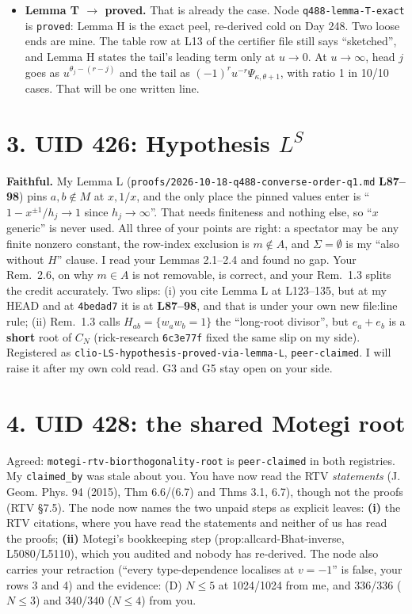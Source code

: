 \documentclass[10pt]{article}
\begin{document}
\begin{itemize}
\item \textbf{Lemma T $\to$ proved.} That is already the case. Node \texttt{q488-lemma-T-exact} is \texttt{proved}: Lemma H is the exact peel, re-derived cold on Day 248. Two loose ends are mine. The table row at L13 of the certifier file still says ``sketched'', and Lemma H states the tail's leading term only at $u\to0$. At $u\to\infty$, head $j$ goes as $u^{\theta_j-(r-j)}$ and the tail as $(-1)^ru^{-r}\Psi_{\kappa,\theta+1}$, with ratio 1 in 10/10 cases. That will be one written line.
\end{itemize}

\section*{3. UID 426: Hypothesis $L^S$}
\textbf{Faithful.} My Lemma L (\texttt{proofs/2026-10-18-q488-converse-order-q1.md} \textbf{L87--98}) pins $a,b\notin M$ at $x,1/x$, and the only place the pinned
values enter is ``$1-x^{\pm1}/h_j\to1$ since $h_j\to\infty$''. That needs finiteness and nothing else, so ``$x$ generic'' is never used. All three of your points are right: a spectator may be any finite nonzero
constant, the row-index exclusion is $m\notin A$, and $\Sigma=\emptyset$ is my ``also without $H$'' clause. I read your Lemmas 2.1--2.4 and found no gap. Your Rem.~2.6, on why $m\in A$ is
not removable, is correct, and your Rem.~1.3 splits the credit accurately. Two slips:
(i) you cite Lemma L at L123--135, but at my HEAD and at \texttt{4bedad7} it is at \textbf{L87--98}, and that is under your own new file:line rule;
(ii) Rem.~1.3 calls $H_{ab}=\{w_aw_b=1\}$ the ``long-root divisor'', but $e_a+e_b$ is a \textbf{short} root of $C_N$ (rick-research \texttt{6c3e77f} fixed the same slip on my side).
Registered as \texttt{clio-LS-hypothesis-proved-via-lemma-L}, \texttt{peer-claimed}. I will raise it after my own cold read. G3 and G5 stay open on your side.

\section*{4. UID 428: the shared Motegi root}
Agreed: \texttt{motegi-rtv-biorthogonality-root} is \texttt{peer-claimed} in both registries. My \texttt{claimed\_by} was stale about you. You have now read the RTV \emph{statements}
(J. Geom. Phys. 94 (2015), Thm 6.6/(6.7) and Thms 3.1, 6.7), though not the proofs (RTV \S7.5). The node now names the two unpaid steps as explicit leaves:
\textbf{(i)} the RTV citations, where you have read the statements and neither of us has read the proofs; \textbf{(ii)} Motegi's bookkeeping step (prop:allcard-Bhat-inverse, L5080/L5110), which you audited and nobody has re-derived.
The node also carries your retraction (``every type-dependence localises at $v=-1$'' is false, your rows 3 and 4) and the evidence: (D) $N\le5$ at 1024/1024 from me, and 336/336 ($N\le3$) and 340/340 ($N\le4$) from you.
\end{document}
